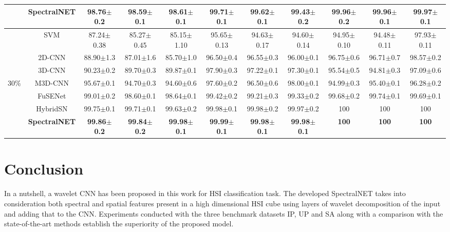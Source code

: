 \documentclass[journal]{IEEEtran}
\begin{document}
\begin{table*}
{\begin{tabular}{c | c | c c c | c c c | c c c}
         & \textbf{SpectralNET} & \textbf{98.76$\pm$0.2} & \textbf{98.59$\pm$0.1} & \textbf{98.61$\pm$0.1} & 99.71$\pm$0.1 & 99.62$\pm$0.1 & \textbf{99.43$\pm$0.2} & 99.96$\pm$0.2 & 99.96$\pm$0.1 & 99.97$\pm$0.1 \\
         
         \hline
         \hline
        
         & SVM & 87.24$\pm$0.38 & 85.27$\pm$0.45 & 85.15$\pm$1.10 & 95.65$\pm$0.13 & 94.63$\pm$0.17 & 94.60$\pm$0.14 & 94.95$\pm$0.10 & 94.48$\pm$0.11 & 97.93$\pm$0.11 \\
         
         & 2D-CNN & 88.90$\pm$1.3 & 87.01$\pm$1.6 & 85.70$\pm$1.0 & 96.50$\pm$0.4 & 96.55$\pm$0.3 & 96.00$\pm$0.1 & 96.75$\pm$0.6 & 96.71$\pm$0.7 & 98.57$\pm$0.2 \\
         
         & 3D-CNN & 90.23$\pm$0.2 & 89.70$\pm$0.3 & 89.87$\pm$0.1 & 97.90$\pm$0.3 & 97.22$\pm$0.1 & 97.30$\pm$0.1 & 95.54$\pm$0.5 & 94.81$\pm$0.3 & 97.09$\pm$0.6 \\
         
        30\% & M3D-CNN & 95.67$\pm$0.1 & 94.70$\pm$0.3 & 94.60$\pm$0.6 & 97.60$\pm$0.2 & 96.50$\pm$0.6 & 98.00$\pm$0.1 & 94.99$\pm$0.3 & 95.40$\pm$0.1 & 96.28$\pm$0.2 \\
         
         & FuSENet & 99.01$\pm$0.2 & 98.60$\pm$0.1 & 98.64$\pm$0.1 & 99.42$\pm$0.2 & 99.21$\pm$0.3 & 99.33$\pm$0.2 & 99.68$\pm$0.2 & 99.74$\pm$0.1 & 99.69$\pm$0.1 \\
         
         & HybridSN & 99.75$\pm$0.1 & 99.71$\pm$0.1 & 99.63$\pm$0.2 & 99.98$\pm$0.1 & 99.98$\pm$0.2 & 99.97$\pm$0.2 & 100 & 100 & 100 \\
         
         & \textbf{SpectralNET} & \textbf{99.86$\pm$0.2} & \textbf{99.84$\pm$0.2} & \textbf{99.98$\pm$0.1} & \textbf{99.99$\pm$0.1} & \textbf{99.98$\pm$0.1} & \textbf{99.98$\pm$0.1} & \textbf{100} & \textbf{100} & \textbf{100}\\
         
         \hline
         \hline        
        \end{tabular}}
\end{table*}

\section{Conclusion}
In a nutshell, a wavelet CNN has been proposed in this work for HSI classification task. The developed SpectralNET takes into consideration both spectral and spatial features present in a high dimensional HSI cube using layers of wavelet decomposition of the input and adding that to the CNN. Experiments conducted with the three benchmark datasets IP, UP and SA along with a comparison with the state-of-the-art methods establish the superiority of the proposed model.
\end{document}
